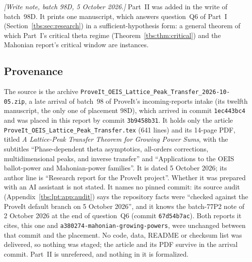\documentclass[11pt,a4paper]{article}
\numberwithin{equation}{section}
\theoremstyle{definition}
\newcommand{\code}[1]{\texttt{#1}}
\begin{document}
\emph{[Write note, batch 98D, 5 October 2026.]} Part~II was added in the
write of batch~98D. It prints one manuscript, which answers question~Q6
of Part~I (Section~\ref{tbs:sec:research}) in a sufficient-hypothesis
form: a general theorem of which Part~I's critical theta regime
(Theorem~\ref{tbs:thm:critical}) and the Mahonian report's critical
window are instances.

\subsection{Provenance}\label{tbs:lpt:sec:provenance}
The source is the archive
\nolinkurl{ProveIt_OEIS_Lattice_Peak_Transfer_2026-10-05.zip}, a late
arrival of batch~98 of ProveIt's incoming-reports intake (its twelfth
manuscript, the only one of placement 98D), which arrived in commit
\code{1ec443bc4} and was placed in this report by commit
\code{3b9458b31}. It holds only the article
\nolinkurl{ProveIt_OEIS_Lattice_Peak_Transfer.tex} (641 lines) and its
14-page PDF, titled \emph{A Lattice-Peak Transfer Theorem for Growing
Power Sums}, with the subtitles ``Phase-dependent theta asymptotics,
all-orders corrections, multidimensional peaks, and inverse transfer''
and ``Applications to the OEIS ballot-power and Mahonian-power
families''. It is dated 5 October 2026; its author line is ``Research
report for the ProveIt project''. Whether it was prepared with an AI
assistant is not stated. It names no pinned commit: its source audit
(Appendix~\ref{tbs:lpt:app:audit}) says the repository facts were
``checked against the ProveIt default branch on 5 October 2026'', and it
knows the batch-77P2 note of 2 October 2026 at the end of question~Q6
(commit \code{67d54b7ac}). Both reports it cites, this one and
\nolinkurl{a380274-mahonian-growing-powers}, were unchanged between that
commit and the placement. No code, data, README or checksum list was
delivered, so nothing was staged; the article and its PDF survive in the
arrival commit. Part~II is unrefereed, and nothing in it is formalized.
\end{document}
